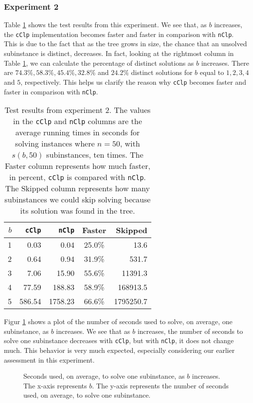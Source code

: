 \subsubsection{Experiment 2}
Table \ref{table:exptwo} shows the test results from this experiment. We see
that, as $b$ increases, the \texttt{cClp} implementation becomes
faster and faster in comparison with \texttt{nClp}.
This is due to the fact that as the tree grows in size, the chance that
an unsolved subinstance is distinct, decreases. In fact, looking at the
rightmost column in Table \ref{table:exptwo}, we can calculate the percentage
of distinct solutions as $b$ increases.
There are $74.3\%, 58.3\%, 45.4\%, 32.8\%$ and $24.2\%$ distinct solutions for
$b$ equal to $1,2,3,4$ and $5$, respectively. This helps us clarify the reason
why \texttt{cClp} becomes faster and faster in comparison with \texttt{nClp}.
\begin{table}[ht!]
\centering
\caption{Test results from experiment 2.
         The values in the \texttt{cClp} and \texttt{nClp} columns are the
         average running times in seconds for solving instances where $n = 50$,
         with $s(b, 50)$ subinstances, ten times.
         The Faster column represents how much faster, in percent,
         \texttt{cClp} is compared with \texttt{nClp}.
         The Skipped column represents how many subinstances we could skip
         solving because its solution was found in the tree.
         }
\begin{tabular}{rrrcr}
      $b$ & \texttt{cClp} & \texttt{nClp} & Faster & Skipped\\ \hline
       1  & 0.03 & 0.04 & 25.0\% & 13.6 \\
       2  & 0.64 & 0.94 & 31.9\% & 531.7 \\
       3  & 7.06 & 15.90 & 55.6\% & 11391.3 \\
       4  & 77.59 & 188.83 & 58.9\% & 168913.5 \\
       5  & 586.54 & 1758.23 & 66.6\% & 1795250.7 \\
\end{tabular}
\label{table:exptwo}
\end{table}

Figur \ref{fig:constructincb} shows a plot of the number of seconds used to
solve, on average, one subinstance, as $b$ increases.
We see that as $b$ increases, the number of
seconds to solve one subinstance decreases with \texttt{cClp},
but with \texttt{nClp}, it does not change much. This behavior is very
much expected, especially considering our earlier assessment in this
experiment.

\begin{figure}[ht!]
    \centering
    
    \caption{Seconds used, on average, to solve one subinstance, as $b$
             increases.
             The x-axis represents $b$.
             The y-axis represents the number of seconds used, on average,
             to solve one subinstance.}
    \label{fig:constructincb}
\end{figure}
